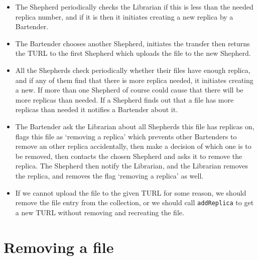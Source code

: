 \documentclass{book}
\begin{document}
\begin{itemize}
\item The Shepherd periodically checks the Librarian if this is less than the needed replica number, and if it is then it initiates creating a new replica by a Bartender.
\item The Bartender chooses another Shepherd, initiates the transfer then returns the TURL to the  first Shepherd which uploads the file to the new Shepherd.
\item All the Shepherds check periodically whether their files have enough replica, and if any of them find that there is more replica needed, it initiates creating a new. If more than one Shepherd of course could cause that there will be more replicas than needed. If a Shepherd finds out that a file has more replicas than needed it notifies a Bartender about it.
\item The Bartender ask the Librarian about all Shepherds this file has replicas on, flags this file as `removing a replica' which prevents other Bartenders to remove an other replica accidentally, then make a decision of which one is to be removed, then contacts the chosen Shepherd and asks it to remove the replica. The Shepherd then notify the Librarian, and the Librarian removes the replica, and removes the flag `removing a replica' as well.
\item If we cannot upload the file to the given TURL for some reason, we should remove the file entry from the collection, or we should call \verb#addReplica# to get a new TURL without removing and recreating the file.
\end{itemize}


\section{Removing a file} %
\label{sec:removing_a_file}
\end{document}
